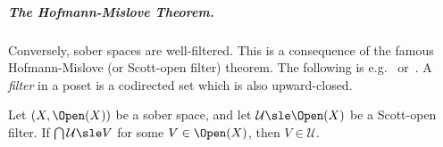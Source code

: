 \subparagraph*{The Hofmann-Mislove Theorem.}
Conversely, sober spaces are well-filtered.
This is a consequence of the famous Hofmann-Mislove (or Scott-open filter)
theorem.
The following is e.g.~\cite[Theorem 8.3.2]{goubault13book}
or~\cite[Theorem 7.2.9]{aj95chapter}.
A \emph{filter} in a poset is a codirected set which is also upward-closed.

\begin{theorem}
\label{thm:proof:spectral:hofmann-mislove}
Let $(X, \Open(X))$ be a sober space,
and let $\mathcal{U} \sle \Open(X)$ be a Scott-open filter.
If $\bigcap \mathcal{U} \sle V$ for some $V \in \Open(X)$,
then $V \in \mathcal{U}$.
\end{theorem}


